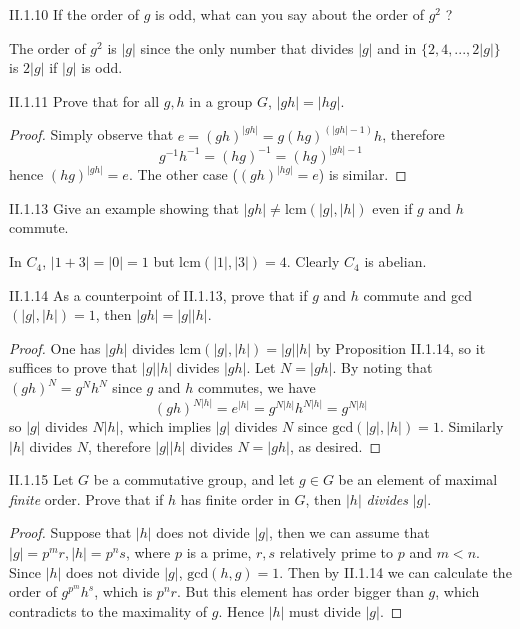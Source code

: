 \begin{problem}{II.1.10}
If the order of $g$ is odd, what can you say about the order of $g^2$ ?
\end{problem}
\begin{solution}
The order of $g^2$ is $|g|$ since the only number that divides $|g|$ and in $\{2, 4, ..., 2|g|\}$ is $2|g|$ if $|g|$ is odd.
\end{solution}

\begin{problem}{II.1.11}
Prove that for all $g, h$ in a group $G$, $|gh| = |hg|$.
\end{problem}
\begin{proof}
Simply observe that $e = (gh)^{|gh|} = g(hg)^{(|gh|-1)}h$, therefore 
\[
g^{-1}h^{-1} = (hg)^{-1} = (hg)^{|gh|-1}
\]
hence $(hg)^{|gh|} = e$. The other case ($(gh)^{|hg|} = e$) is similar.
\end{proof}

\begin{problem}{II.1.13}
Give an example showing that $|gh| \neq \text{lcm}(|g|, |h|)$ even if $g$ and $h$ commute.
\end{problem}
\begin{solution}
In $C_4$, $|1 + 3| = |0| = 1$ but $\text{lcm}(|1|, |3|) = 4$. Clearly $C_4$ is abelian.
\end{solution}

\begin{problem}{II.1.14}
As a counterpoint of II.1.13, prove that if $g$ and $h$ commute and gcd$(|g|, |h|) = 1$, then $|gh| = |g||h|$. 
\end{problem}
\begin{proof}
One has $|gh|$ divides $\text{lcm}(|g|, |h|) = |g||h|$ by Proposition II.1.14, so it suffices to prove that $|g||h|$ divides $|gh|$. Let $N = |gh|$. By noting that $(gh)^N = g^Nh^N$ since $g$ and $h$ commutes, we have
\[
(gh)^{N|h|} = e^{|h|} = g^{N|h|}h^{N|h|} = g^{N|h|}
\]
so $|g|$ divides $N|h|$, which implies $|g|$ divides $N$ since $\text{gcd}(|g|, |h|) = 1$. Similarly $|h|$ divides $N$, therefore $|g||h|$ divides $N = |gh|$, as desired.
\end{proof}

\begin{problem}{II.1.15}
Let $G$ be a commutative group, and let $g\in G$ be an element of maximal \emph{finite} order. Prove that if $h$ has finite order in $G$, then $|h|$ \emph{divides} $|g|$.
\end{problem}
\begin{proof}
Suppose that $|h|$ does not divide $|g|$, then we can assume that $|g| = p^mr, |h| = p^ns$, where $p$ is a prime, $r, s$ relatively prime to $p$ and $m<n$. Since $|h|$ does not divide $|g|$, $\text{gcd}(h,g) = 1$. Then by II.1.14 we can calculate the order of $g^{p^m}h^s$, which is $p^nr$. But this element has order bigger than $g$, which contradicts to the maximality of $g$. Hence $|h|$ must divide $|g|$.
\end{proof}

